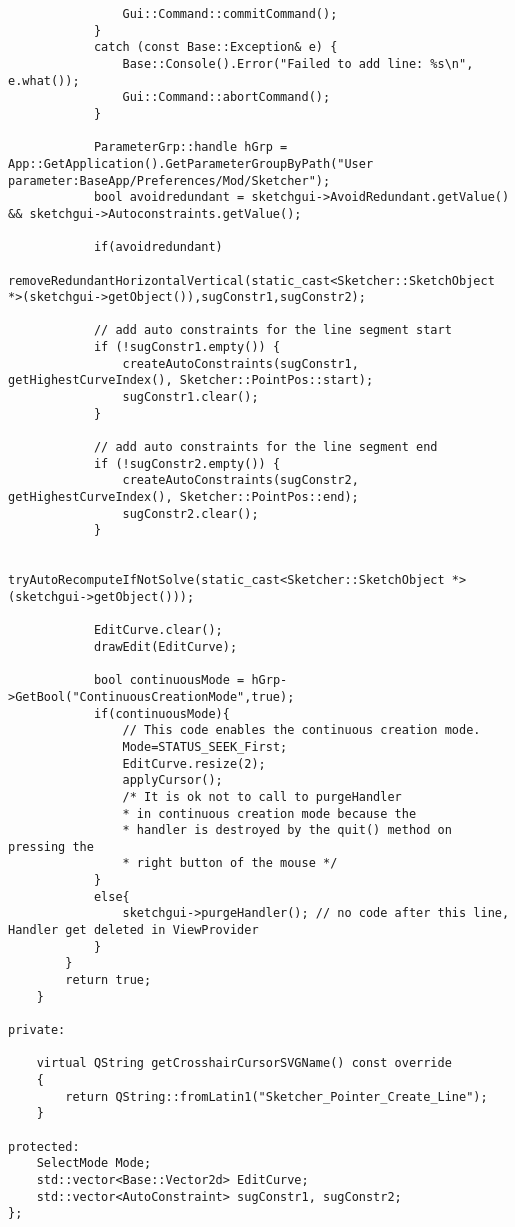\documentclass[12pt,twoside,a4paper]{book}
\begin{document}
\begin{lstlisting}
                Gui::Command::commitCommand();
            }
            catch (const Base::Exception& e) {
                Base::Console().Error("Failed to add line: %s\n", e.what());
                Gui::Command::abortCommand();
            }

            ParameterGrp::handle hGrp = App::GetApplication().GetParameterGroupByPath("User parameter:BaseApp/Preferences/Mod/Sketcher");
            bool avoidredundant = sketchgui->AvoidRedundant.getValue()  && sketchgui->Autoconstraints.getValue();

            if(avoidredundant)
                removeRedundantHorizontalVertical(static_cast<Sketcher::SketchObject *>(sketchgui->getObject()),sugConstr1,sugConstr2);

            // add auto constraints for the line segment start
            if (!sugConstr1.empty()) {
                createAutoConstraints(sugConstr1, getHighestCurveIndex(), Sketcher::PointPos::start);
                sugConstr1.clear();
            }

            // add auto constraints for the line segment end
            if (!sugConstr2.empty()) {
                createAutoConstraints(sugConstr2, getHighestCurveIndex(), Sketcher::PointPos::end);
                sugConstr2.clear();
            }

            tryAutoRecomputeIfNotSolve(static_cast<Sketcher::SketchObject *>(sketchgui->getObject()));

            EditCurve.clear();
            drawEdit(EditCurve);

            bool continuousMode = hGrp->GetBool("ContinuousCreationMode",true);
            if(continuousMode){
                // This code enables the continuous creation mode.
                Mode=STATUS_SEEK_First;
                EditCurve.resize(2);
                applyCursor();
                /* It is ok not to call to purgeHandler
                * in continuous creation mode because the
                * handler is destroyed by the quit() method on pressing the
                * right button of the mouse */
            }
            else{
                sketchgui->purgeHandler(); // no code after this line, Handler get deleted in ViewProvider
            }
        }
        return true;
    }

private:

    virtual QString getCrosshairCursorSVGName() const override
    {
        return QString::fromLatin1("Sketcher_Pointer_Create_Line");
    }

protected:
    SelectMode Mode;
    std::vector<Base::Vector2d> EditCurve;
    std::vector<AutoConstraint> sugConstr1, sugConstr2;
};
    \end{lstlisting}
\end{document}
